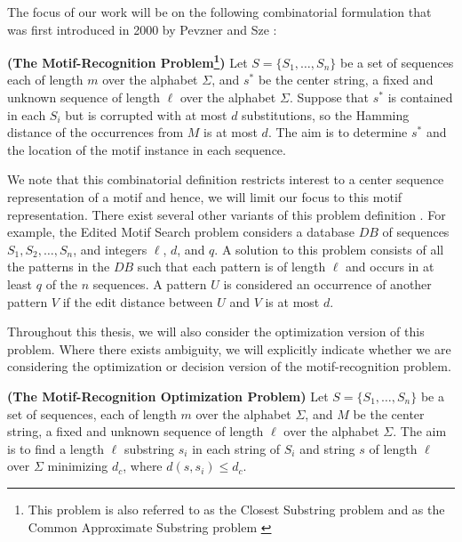 \newpage

The focus of our work will be on the following combinatorial formulation that was first introduced in 2000 by Pevzner and Sze \cite{PS00}:
 
\begin{definition} \label{def:combinatorial_motif}{\bf (The Motif-Recognition Problem\footnote{This problem is also referred to as the {\sc Closest Substring} problem \cite{LLMWZ00,ma00} and as the {\sc Common Approximate Substring} problem \cite{asmith}})} Let $S = \{S_1, \ldots, S_n\}$ be a set of sequences each of length $m$ over the alphabet $\Sigma$, and $s^*$ be the center string, a fixed and unknown sequence of length $\ell$ over the alphabet $\Sigma$.  Suppose that $s^*$ is contained in each $S_i$ but is corrupted with at most $d$ substitutions, so the Hamming distance of the occurrences from $M$ is at most $d$. The aim is to determine $s^*$ and the location of the motif instance in each sequence. \end{definition}

We note that this combinatorial definition restricts interest to a center sequence representation of a motif and hence, we will limit our focus to this motif representation.  There exist several other variants of this problem definition \cite{AK02,FR98,m83,RBH05,MF98}. For example, the {\sc Edited Motif Search} problem \cite{AK02,RBH05,MF98} considers a database $DB$ of sequences $S_1, S_2, \ldots, S_n$, and integers $\ell$, $d$, and $q$. A solution to this problem consists of all the patterns in the $DB$ such that each pattern is of length $\ell$ and occurs in at least $q$ of the $n$ sequences.  A pattern $U$ is considered an occurrence of another pattern $V$ if the edit distance between $U$ and $V$ is at most $d$. 

Throughout this thesis, we will also consider the optimization version of this problem.  Where there exists ambiguity, we will explicitly indicate whether we are considering the optimization or decision version of the motif-recognition problem. 

\begin{definition} {\bf (The Motif-Recognition Optimization Problem)} Let $S = \{S_1, \ldots, S_n\}$ be a set of sequences, each of length $m$ over the alphabet $\Sigma$, and $M$ be the center string, a fixed and unknown sequence of length $\ell$ over the alphabet $\Sigma$.  The aim is to find a length $\ell$ substring $s_i$ in each string of $S_i$ and string $s$ of length $\ell$ over $\Sigma$ minimizing $d_c$, where $d(s, s_i) \leq d_c$. \end{definition}     


